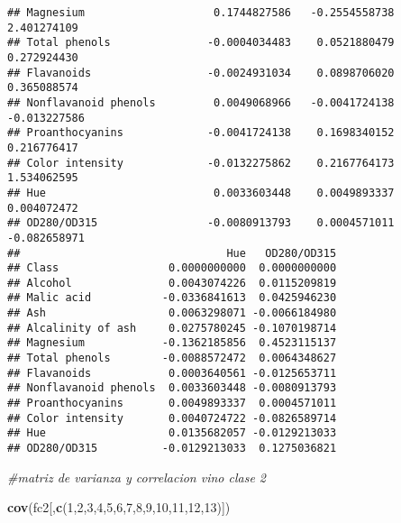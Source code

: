 \documentclass[
]{article}
\newenvironment{Shaded}{\begin{snugshade}}{\end{snugshade}}
\newcommand{\CommentTok}[1]{\textcolor[rgb]{0.56,0.35,0.01}{\textit{#1}}}
\newcommand{\DecValTok}[1]{\textcolor[rgb]{0.00,0.00,0.81}{#1}}
\newcommand{\KeywordTok}[1]{\textcolor[rgb]{0.13,0.29,0.53}{\textbf{#1}}}
\newcommand{\NormalTok}[1]{#1}
\begin{document}
\begin{verbatim}
## Magnesium                    0.1744827586   -0.2554558738     2.401274109
## Total phenols               -0.0004034483    0.0521880479     0.272924430
## Flavanoids                  -0.0024931034    0.0898706020     0.365088574
## Nonflavanoid phenols         0.0049068966   -0.0041724138    -0.013227586
## Proanthocyanins             -0.0041724138    0.1698340152     0.216776417
## Color intensity             -0.0132275862    0.2167764173     1.534062595
## Hue                          0.0033603448    0.0049893337     0.004072472
## OD280/OD315                 -0.0080913793    0.0004571011    -0.082658971
##                                Hue   OD280/OD315
## Class                 0.0000000000  0.0000000000
## Alcohol               0.0043074226  0.0115209819
## Malic acid           -0.0336841613  0.0425946230
## Ash                   0.0063298071 -0.0066184980
## Alcalinity of ash     0.0275780245 -0.1070198714
## Magnesium            -0.1362185856  0.4523115137
## Total phenols        -0.0088572472  0.0064348627
## Flavanoids            0.0003640561 -0.0125653711
## Nonflavanoid phenols  0.0033603448 -0.0080913793
## Proanthocyanins       0.0049893337  0.0004571011
## Color intensity       0.0040724722 -0.0826589714
## Hue                   0.0135682057 -0.0129213033
## OD280/OD315          -0.0129213033  0.1275036821
\end{verbatim}

\begin{Shaded}
\begin{Highlighting}[]
\CommentTok{#matriz de varianza y correlacion vino clase 2}

\KeywordTok{cov}\NormalTok{(fc2[,}\KeywordTok{c}\NormalTok{(}\DecValTok{1}\NormalTok{,}\DecValTok{2}\NormalTok{,}\DecValTok{3}\NormalTok{,}\DecValTok{4}\NormalTok{,}\DecValTok{5}\NormalTok{,}\DecValTok{6}\NormalTok{,}\DecValTok{7}\NormalTok{,}\DecValTok{8}\NormalTok{,}\DecValTok{9}\NormalTok{,}\DecValTok{10}\NormalTok{,}\DecValTok{11}\NormalTok{,}\DecValTok{12}\NormalTok{,}\DecValTok{13}\NormalTok{)])}
\end{Highlighting}
\end{Shaded}
\end{document}
